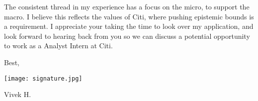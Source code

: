 \documentclass{vivek-cover-letter}
\begin{document}
\begin{changemargin}{.7in}{.7in}
The consistent thread in my experience has a focus on the micro, to support the macro. I believe this reflects the values of Citi, where pushing epistemic bounds is a requirement. I appreciate your taking the time to look over my application, and look forward to hearing back from you so we can discuss a potential opportunity to work as a Analyst Intern at Citi. 


\vspace{0.5em}

Best,

 \texttt{[image: signature.jpg]}
 \vspace{-.25cm}

Vivek H.

\end{changemargin} 
\end{document}
